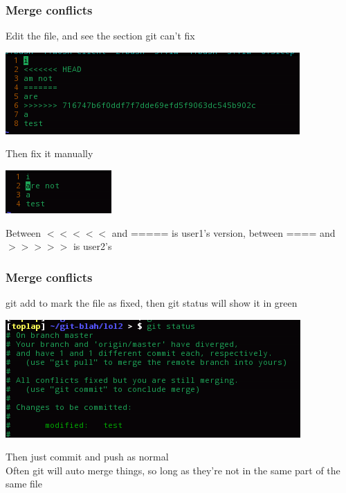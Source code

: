 \documentclass[xcolor=dvipsnames]{beamer}
\begin{document}
\begin{frame}
    \frametitle{Merge conflicts}

    Edit the file, and see the section git can't fix

    \begin{center}
        \includegraphics[scale=0.4]{mergeconflict3.png}
    \end{center}

    Then fix it manually

    \begin{center}
        \includegraphics[scale=0.4]{mergeconflict4.png}
    \end{center}

    Between $<<<<<$ and ===== is user1's version, between ==== and $>>>>>$ is user2's
\end{frame}


\begin{frame}
    \frametitle{Merge conflicts}

    git add to mark the file as fixed, then git status will show it in green

    \begin{center}
        \includegraphics[scale=0.4]{mergeconflict5.png}
    \end{center}

    Then just commit and push as normal\\
    Often git will auto merge things, so long as they're not in the same part of the same file
\end{frame}
\end{document}
